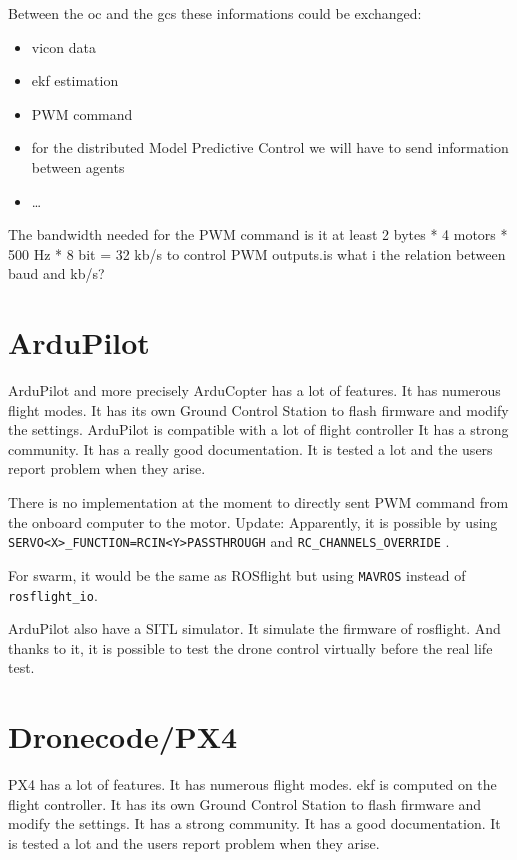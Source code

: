     Between the \gls{oc} and the \gls{gcs} these informations could be exchanged:
    \begin{itemize}
        \item vicon data
        \item \gls{ekf} estimation
        \item PWM command
        \item for the distributed Model Predictive Control we will have to send information between agents
        \item …
    \end{itemize}
    
    The bandwidth needed for the PWM command is it at least
    2 bytes * 4 motors * 500 Hz * 8 bit = 32 kb/s to control PWM outputs.{\color{red}is what i the relation between baud and kb/s?}

    \section{ArduPilot}
        ArduPilot and more precisely ArduCopter has a lot of features.
        It has numerous flight modes.
        It has its own Ground Control Station to flash firmware and modify the settings.
        ArduPilot is compatible with a lot of flight controller
        It has a strong community.
        It has a really good documentation.
        It is tested a lot and the users report problem when they arise.
        
        There is no implementation at the moment to directly sent PWM command from the onboard computer to the motor.
        {\color{blue} Update: Apparently, it is possible by using \texttt{SERVO<X>\_FUNCTION=RCIN<Y>PASSTHROUGH} and \texttt{RC\_CHANNELS\_OVERRIDE}}
        \cite{github_ardupilot_11859}.
        
        For swarm, it would be the same as ROSflight but using \texttt{MAVROS} instead of \texttt{rosflight\_io}.
        
        ArduPilot also have a SITL simulator. It simulate the firmware of rosflight. And thanks to it, it is possible to test the drone control virtually before the real life test.
    
    \section{Dronecode/PX4}
        PX4 has a lot of features.
        It has numerous flight modes.
        \Gls{ekf} is computed on the flight controller.
        It has its own Ground Control Station to flash firmware and modify the settings.
        It has a strong community.
        It has a good documentation.
        It is tested a lot and the users report problem when they arise.
        
